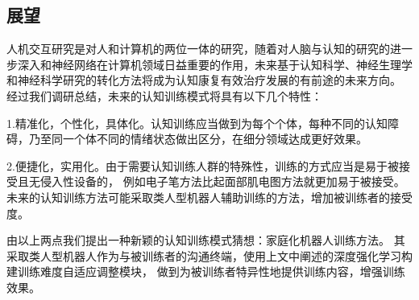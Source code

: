 \documentclass{article}
\begin{document}
    \subsection{展望}
    人机交互研究是对人和计算机的两位一体的研究，随着对人脑与认知的研究的进一步深入和神经网络在计算机领域日益重要的作用，未来基于认知科学、神经生理学和神经科学研究的转化方法将成为认知康复有效治疗发展的有前途的未来方向。
    经过我们调研总结，未来的认知训练模式将具有以下几个特性：

    1.精准化，个性化，具体化。认知训练应当做到为每个个体，每种不同的认知障碍，乃至同一个体不同的情绪状态做出区分，在细分领域达成更好效果。

    2.便捷化，实用化。由于需要认知训练人群的特殊性，训练的方式应当是易于被接受且无侵入性设备的，
    例如电子笔方法比起面部肌电图方法就更加易于被接受。未来的认知训练方法可能采取类人型机器人辅助训练的方法，增加被训练者的接受度。

    由以上两点我们提出一种新颖的认知训练模式猜想：家庭化机器人训练方法。
    其采取类人型机器人作为与被训练者的沟通终端，使用上文中阐述的深度强化学习构建训练难度自适应调整模块，
    做到为被训练者特异性地提供训练内容，增强训练效果。
\end{document}
